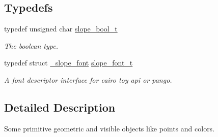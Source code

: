 \subsection*{Typedefs}
\begin{DoxyCompactItemize}
\item 
\hypertarget{group__Primitives_gac55afa016ca777119a6c343d1655d558}{typedef unsigned char \hyperlink{group__Primitives_gac55afa016ca777119a6c343d1655d558}{slope\+\_\+bool\+\_\+t}}\label{group__Primitives_gac55afa016ca777119a6c343d1655d558}

\begin{DoxyCompactList}\small\item\em The boolean type. \end{DoxyCompactList}\item 
\hypertarget{group__Primitives_ga29945f78eef5fcab497a3d15908b4b73}{typedef struct \hyperlink{struct__slope__font}{\+\_\+slope\+\_\+font} \hyperlink{group__Primitives_ga29945f78eef5fcab497a3d15908b4b73}{slope\+\_\+font\+\_\+t}}\label{group__Primitives_ga29945f78eef5fcab497a3d15908b4b73}

\begin{DoxyCompactList}\small\item\em A font descriptor interface for cairo toy api or pango. \end{DoxyCompactList}\end{DoxyCompactItemize}


\subsection{Detailed Description}
Some primitive geometric and visible objects like points and colors. 

